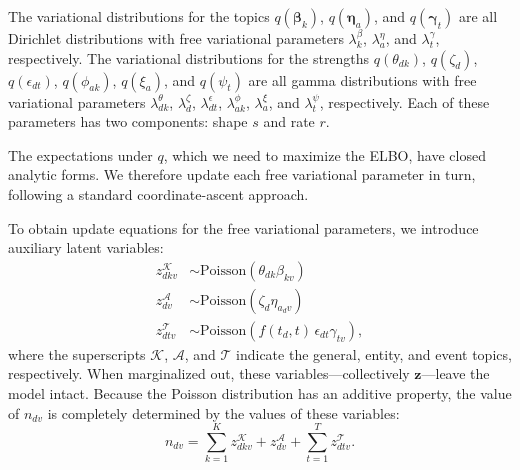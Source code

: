 The variational distributions for the topics $q(\mathbold{\beta}_k)$,
$q(\mathbold{\eta}_a)$, and $q(\mathbold{\gamma}_t)$ are all Dirichlet
distributions with free variational parameters $\lambda_{k}^{\beta}$,
$\lambda_a^{\eta}$, and $\lambda_t^{\gamma}$, respectively. The
variational distributions for the strengths $q(\theta_{dk})$,
$q(\zeta_{d})$, $q(\epsilon_{dt})$, $q(\phi_{ak})$, $q(\xi_a)$, and
$q(\psi_t)$ are all gamma distributions with free variational
parameters $\lambda_{dk}^{\theta}$, $\lambda_d^{\zeta}$,
$\lambda_{dt}^{\epsilon}$, $\lambda_{ak}^{\phi}$, $\lambda_a^{\xi}$,
and $\lambda_{t}^{\psi}$, respectively. Each of these parameters has
two components: shape $s$ and rate $r$.

The expectations under $q$, which we need to maximize the ELBO, have
closed analytic forms. We therefore update each free variational
parameter in turn, following a standard coordinate-ascent approach.

To obtain update equations for the free variational parameters, we
introduce auxiliary latent variables:
\begin{align}
z_{dkv}^{\mathcal{K}}
&\sim \textrm{Poisson}\left(\theta_{dk}\beta_{kv}\right)\\
z_{dv}^{\mathcal{A}}
&\sim \textrm{Poisson}\left(\zeta_{d}\eta_{a_d v}\right)\\
z_{dtv}^{\mathcal{T}}
&\sim \textrm{Poisson}\left(f(t_d, t)\,\epsilon_{d t} \gamma_{tv}\right),
\end{align}
where the superscripts $\mathcal{K}$, $\mathcal{A}$, and $\mathcal{T}$
indicate the general, entity, and event topics, respectively. When
marginalized out, these variables---collectively $\mathbf{z}$---leave the model
intact. Because the Poisson distribution has an additive
property, the value of $n_{dv}$ is completely determined by the values
of these variables:
\begin{equation}
n_{dv} = \sum_{k=1}^K z_{dkv}^{\mathcal{K}} + z_{dv}^{\mathcal{A}}
+ \sum_{t=1}^T z_{dtv}^{\mathcal{T}}.
\end{equation}

